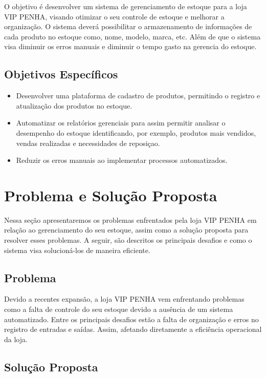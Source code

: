 \documentclass[
	12pt,				%
	openany,			%
	twoside,			%
	a4paper,			%
	english,			%
	brazil				%
	]{abntex2}
\begin{document}
O objetivo é desenvolver um sistema de gerenciamento de estoque para a loja VIP PENHA, visando otimizar o seu controle de estoque e melhorar a organização. O sistema deverá possibilitar o armazenamento de informações de cada produto no estoque como, nome, modelo, marca, etc. Além de que o sistema visa diminuir os erros manuais e diminuir o tempo gasto na gerencia do estoque.

\subsection{Objetivos Específicos}

\begin{itemize}
    \item Desenvolver uma plataforma de cadastro de produtos, permitindo o registro e atualização dos produtos no estoque.
    \item Automatizar os relatórios gerenciais para assim permitir analisar o desempenho do estoque identificando, por exemplo, produtos mais vendidos, vendas realizadas e necessidades de reposiçao.
    \item Reduzir os erros manuais ao implementar processos automatizados.
\end{itemize}

\section{Problema e Solução Proposta}

Nessa seção apresentaremos os problemas enfrentados pela loja VIP PENHA em relação ao gerenciamento do seu estoque, assim como a solução proposta para resolver esses problemas. A seguir, são descritos os principais desafios e como o sistema visa solucioná-los de maneira eficiente.

\subsection{Problema}

Devido a recentes expansão, a loja VIP PENHA vem enfrentando problemas como a falta de controle do seu estoque devido a ausência de um sistema automatizado. Entre os principais desafios estão a falta de organização e erros no registro de entradas e saídas. Assim, afetando diretamente a eficiência operacional da loja.

\subsection{Solução Proposta}
\end{document}
